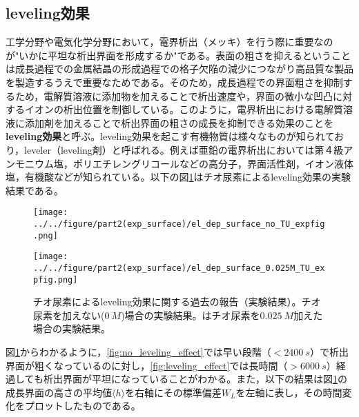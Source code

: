 \documentclass[autodetect-engine,dvi=dvipdfmx,a4paper,ja=standard,oneside,openany,11pt,draft]{bxjsbook}
\begin{document}
\subsection{leveling効果}
工学分野や電気化学分野において，電界析出（メッキ）を行う際に重要なのが"いかに平坦な析出界面を形成するか"である。表面の粗さを抑えるということは成長過程での金属結晶の形成過程での格子欠陥の減少につながり高品質な製品を製造するうえで重要なためである。そのため，成長過程での界面粗さを抑制するため，電解質溶液に添加物を加えることで析出速度や，界面の微小な凹凸に対するイオンの析出位置を制御している。このように，電界析出における電解質溶液に添加剤を加えることで析出界面の粗さの成長を抑制できる効果のことを\textbf{leveling効果}と呼ぶ。leveling効果を起こす有機物質は様々なものが知られており，leveler（leveling剤）と呼ばれる。例えば亜鉛の電界析出においては第４級アンモニウム塩，ポリエチレングリコールなどの高分子，界面活性剤，イオン液体塩，有機酸\cite{sorour2017review}などが知られている。以下の図\ref{fig:leveling}はチオ尿素によるleveling効果の実験結果である\cite{schilardi1998evolution}。
\begin{figure}[H]
  \begin{minipage}
    {0.5\textwidth}
    \caption{}
    \centering
    \texttt{[image: ../../figure/part2(exp\_surface)/el\_dep\_surface\_no\_TU\_expfig.png]}
    \label{fig:no_leveling_effect}
  \end{minipage}
  \begin{minipage}
    {0.5\textwidth}
    \caption{}
    \centering
    \texttt{[image: ../../figure/part2(exp\_surface)/el\_dep\_surface\_0.025M\_TU\_expfig.png]}
    \label{fig:leveling_effect}
  \end{minipage}
  \caption{チオ尿素によるleveling効果に関する過去の報告（実験結果）\cite{schilardi1998evolution}。チオ尿素を加えない($\SI{0}{M}$)場合の実験結果。はチオ尿素を$\SI{0.025}{M}$加えた場合の実験結果。}
  \label{fig:leveling}
\end{figure}
図\ref{fig:leveling}からわかるように，\ref{fig:no_leveling_effect}では早い段階（$<\SI{2400}{s}$）で析出界面が粗くなっているのに対し，\ref{fig:leveling_effect}では長時間（$>\SI{6000}{s}$）経過しても析出界面が平坦になっていることがわかる。また，以下の結果は図\ref{fig:leveling}の成長界面の高さの平均値$\langle h\rangle$を右軸にその標準偏差$W_L$を左軸に表し，その時間変化をプロットしたものである。
\end{document}
